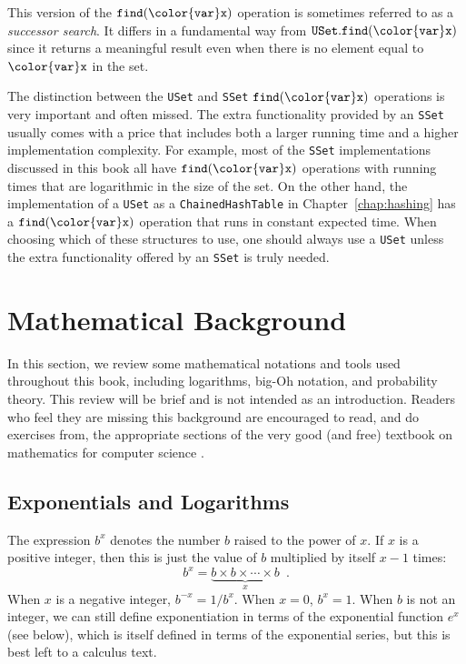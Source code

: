 \documentclass[10pt]{book}
\newcommand{\chapref}[1]{Chapter~\ref{chap:#1}}
\theoremstyle{plain}
\theoremstyle{definition}
\begin{document}
This version of the \ensuremath{\mathtt{find({\color{var}x})}} operation is sometimes referred to
as a \emph{successor search}.
%
It differs in a fundamental way from
\ensuremath{\mathtt{USet.find({\color{var}x})}} since it returns a meaningful result even when there is
no element equal to \ensuremath{\mathtt{{\color{var}x}}} in the set.

The distinction between the \texttt{USet} and \texttt{SSet} \ensuremath{\mathtt{find({\color{var}x})}} operations is
very important and often missed.  The extra functionality provided
by an \texttt{SSet} usually comes with a price that includes both a larger
running time and a higher implementation complexity.  For example, most
of the \texttt{SSet} implementations discussed in this book all have \ensuremath{\mathtt{find({\color{var}x})}}
operations with running times that are logarithmic in the size of the set.
On the other hand, the implementation of a \texttt{USet} as a \texttt{ChainedHashTable}
in \chapref{hashing} has a \ensuremath{\mathtt{find({\color{var}x})}} operation that runs in constant
expected time.  When choosing which of these structures to use, one should
always use a \texttt{USet} unless the extra functionality offered by an \texttt{SSet}
is truly needed.


\section{Mathematical Background}

In this section, we review some mathematical notations and tools
used throughout this book, including logarithms, big-Oh notation, and
probability theory.  This review will be brief and is not intended as
an introduction. Readers who feel they are missing this background are
encouraged to read, and do exercises from, the appropriate sections of
the very good (and free) textbook on mathematics for computer science
\cite{llm11}.

\subsection{Exponentials and Logarithms}

%
The expression $b^x$ denotes the number $b$ raised to the power of $x$.
If $x$ is a positive integer, then this is just the value of $b$
multiplied by itself $x-1$ times:
\[
    b^x = \underbrace{b\times b\times \cdots \times b}_{x} \enspace .
\]
When $x$ is a negative integer, $b^{-x}=1/b^{x}$.  When $x=0$, $b^x=1$.
When $b$ is not an integer, we can still define exponentiation in terms
of the exponential function $e^x$ (see below), which is itself defined in
terms of the exponential series, but this is best left to a calculus text.
\end{document}
